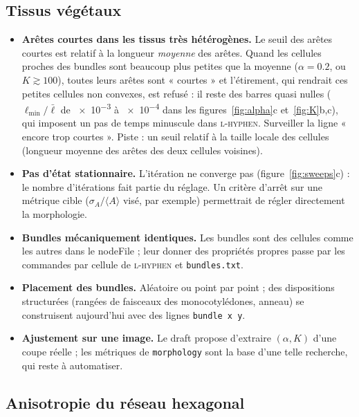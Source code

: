 \documentclass[11pt,a4paper]{article}
\newcommand{\code}[1]{\texttt{#1}}
\begin{document}
\subsection{Tissus végétaux}

\begin{itemize}[nosep]
  \item \textbf{Arêtes courtes dans les tissus très hétérogènes.} Le seuil des arêtes courtes est relatif à la
    longueur \emph{moyenne} des arêtes. Quand les cellules proches des bundles sont beaucoup plus petites que la
    moyenne ($\alpha=0.2$, ou $K\gtrsim100$), toutes leurs arêtes sont « courtes » et l'étirement, qui rendrait ces
    petites cellules non convexes, est refusé : il reste des barres quasi nulles ($\ell_{\min}/\bar\ell$ de
    \num{e-3} à \num{e-4} dans les figures~\ref{fig:alpha}c et~\ref{fig:K}b,c), qui imposent un pas de temps
    minuscule dans \textsc{l-hyphen}. Surveiller la ligne « encore trop courtes ». Piste : un seuil relatif à la
    taille locale des cellules (longueur moyenne des arêtes des deux cellules voisines).
  \item \textbf{Pas d'état stationnaire.} L'itération ne converge pas (figure~\ref{fig:sweeps}c) : le nombre
    d'itérations fait partie du réglage. Un critère d'arrêt sur une métrique cible ($\sigma_A/\langle A\rangle$
    visé, par exemple) permettrait de régler directement la morphologie.
  \item \textbf{Bundles mécaniquement identiques.} Les bundles sont des cellules comme les autres dans le nodeFile ;
    leur donner des propriétés propres passe par les commandes par cellule de \textsc{l-hyphen} et
    \code{bundles.txt}.
  \item \textbf{Placement des bundles.} Aléatoire ou point par point ; des dispositions structurées (rangées de
    faisceaux des monocotylédones, anneau) se construisent aujourd'hui avec des lignes \code{bundle x y}.
  \item \textbf{Ajustement sur une image.} Le draft propose d'extraire $(\alpha,K)$ d'une coupe réelle ; les
    métriques de \code{morphology} sont la base d'une telle recherche, qui reste à automatiser.
\end{itemize}

\subsection{Anisotropie du réseau hexagonal}
\end{document}
